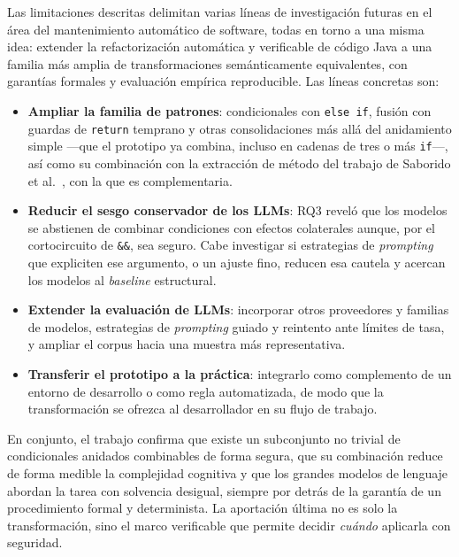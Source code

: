 Las limitaciones descritas delimitan varias líneas de investigación futuras en
el área del mantenimiento automático de software, todas en torno a una misma
idea: extender la refactorización automática y verificable de código Java a una
familia más amplia de transformaciones semánticamente equivalentes, con
garantías formales y evaluación empírica reproducible. Las líneas concretas son:
\begin{itemize}
  \item \textbf{Ampliar la familia de patrones}: condicionales con
  \lstinline|else if|, fusión con guardas de \lstinline|return| temprano y otras
  consolidaciones más allá del anidamiento simple ---que el prototipo ya combina,
  incluso en cadenas de tres o más \lstinline|if|---, así como su combinación con
  la extracción de método del trabajo de Saborido
  et al.~\cite{10.1109/ACCESS.2022.3144743}, con la que es complementaria.
  \item \textbf{Reducir el sesgo conservador de los LLMs}: RQ3 reveló que los
  modelos se abstienen de combinar condiciones con efectos colaterales aunque,
  por el cortocircuito de \lstinline|&&|, sea seguro. Cabe investigar si
  estrategias de \emph{prompting} que expliciten ese argumento, o un ajuste
  fino, reducen esa cautela y acercan los modelos al \emph{baseline} estructural.
  \item \textbf{Extender la evaluación de LLMs}: incorporar otros proveedores y
  familias de modelos, estrategias de \emph{prompting} guiado y reintento ante
  límites de tasa, y ampliar el corpus hacia una muestra más representativa.
  \item \textbf{Transferir el prototipo a la práctica}: integrarlo como
  complemento de un entorno de desarrollo o como regla automatizada, de modo
  que la transformación se ofrezca al desarrollador en su flujo de trabajo.
\end{itemize}

En conjunto, el trabajo confirma que existe un subconjunto no trivial de
condicionales anidados combinables de forma segura, que su combinación reduce
de forma medible la complejidad cognitiva y que los grandes modelos de lenguaje
abordan la tarea con solvencia desigual, siempre por detrás de la garantía de
un procedimiento formal y determinista. La aportación última no es solo la
transformación, sino el marco verificable que permite decidir \emph{cuándo}
aplicarla con seguridad.
